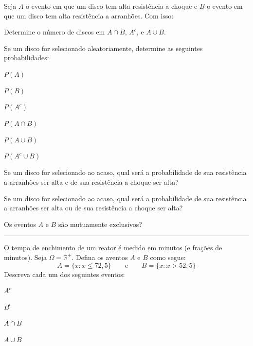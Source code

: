\documentclass[a4paper,11pt,fleqn]{article}\usepackage[]{graphicx}\usepackage[]{color}
\theoremstyle{definition}
\begin{document}
\begin{compactenum}
  Seja $A$ o evento em que um disco tem alta resistência a choque e $B$
  o evento em que um disco tem alta resistência a arranhões. Com isso:
  \begin{compactenum}
  \item Determine o número de discos em $A \cap B$, $A^{c}$, e $A \cup B$.
  \item Se um disco for selecionado aleatoriamente, determine as
    seguintes probabilidades: \\
    \begin{inparaenum}
    \item $P(A)$ \,
    \item $P(B)$ \,
    \item $P(A^{c})$ \,
    \item $P(A \cap B)$ \,
    \item $P(A \cup B)$ \,
    \item $P(A^{c} \cup B)$
    \end{inparaenum}
  \item Se um disco for selecionado ao acaso, qual será a probabilidade
    de sua resistência a arranhões ser alta e de sua resistência a
    choque ser alta?
  \item Se um disco for selecionado ao acaso, qual será a probabilidade
    de sua resistência a arranhões ser alta ou de sua resistência a
    choque ser alta?
  \item Os eventos $A$ e $B$ são mutuamente exclusivos?
  \end{compactenum}

\vspace{0.3cm}
\hrule
\vspace{0.3cm}

\item O tempo de enchimento de um reator é medido em minutos (e frações
  de minutos). Seja $\Omega = \mathbb{R}^{+}$. Defina os aventos $A$ e
  $B$ como segue:
  \begin{equation*}
    A = \{x : x \leq 72,5\} \qquad \text{e} \qquad B = \{x : x > 52,5\}
  \end{equation*}
  Descreva cada um dos seguintes eventos: \\
  \begin{inparaenum}
  \item $A^{c}$ \,
  \item $B^{c}$ \,
  \item $A \cap B$ \,
  \item $A \cup B$
  \end{inparaenum}


\end{compactenum}
\end{document}
